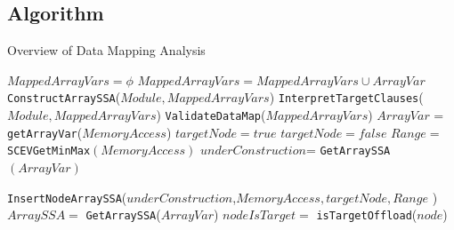 \subsection{Algorithm}
\begin{algorithm}[!htbp]
    \caption{Overview of Data Mapping Analysis}
    \label{dataMapAnalysisAlgo}
    \begin{algorithmic}[1]
        \small 
        \State $MappedArrayVars=\phi$
            \State $MappedArrayVars = MappedArrayVars \cup ArrayVar$
        \EndFor
        \State \texttt{ConstructArraySSA}($Module, MappedArrayVars$)
        \State \texttt{InterpretTargetClauses}($Module, MappedArrayVars$)
        \State \texttt{ValidateDataMap}($MappedArrayVars$)
    \EndFunction
            \State $ArrayVar$ = \texttt{getArrayVar}($MemoryAccess$)
                \State $targetNode = true$
            \Else
                \State $targetNode = false$
            \EndIf
            \State $Range= $ \texttt{SCEVGetMinMax}$(MemoryAccess)$
            \State $underConstruction$= \texttt{GetArraySSA}$(ArrayVar)$
            
            \State {}
            
            \State \texttt{InsertNodeArraySSA}($underConstruction$,$MemoryAccess, targetNode, Range$ )
            \State  {}            
            \EndIf 
        \EndFor
        \EndFunction
            \State $ArraySSA =$ \texttt{GetArraySSA}($ArrayVar$)
                \State $nodeIsTarget =$ \texttt{isTargetOffload}($node$)
                

\end{algorithmic}
\end{algorithm}
